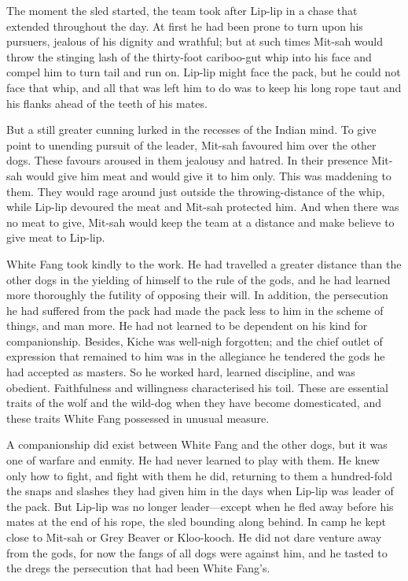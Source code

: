 \documentclass[10pt]{book}
\begin{document}
The moment the sled started, the team took after Lip-lip in a chase
that extended throughout the day. At first he had been prone to turn
upon his pursuers, jealous of his dignity and wrathful; but at such
times Mit-sah would throw the stinging lash of the thirty-foot
cariboo-gut whip into his face and compel him to turn tail and run on.
Lip-lip might face the pack, but he could not face that whip, and all
that was left him to do was to keep his long rope taut and his flanks
ahead of the teeth of his mates.

But a still greater cunning lurked in the recesses of the Indian mind.
To give point to unending pursuit of the leader, Mit-sah favoured him
over the other dogs. These favours aroused in them jealousy and hatred.
In their presence Mit-sah would give him meat and would give it to him
only. This was maddening to them. They would rage around just outside
the throwing-distance of the whip, while Lip-lip devoured the meat and
Mit-sah protected him. And when there was no meat to give, Mit-sah
would keep the team at a distance and make believe to give meat to
Lip-lip.

White Fang took kindly to the work. He had travelled a greater distance
than the other dogs in the yielding of himself to the rule of the gods,
and he had learned more thoroughly the futility of opposing their will.
In addition, the persecution he had suffered from the pack had made the
pack less to him in the scheme of things, and man more. He had not
learned to be dependent on his kind for companionship. Besides, Kiche
was well-nigh forgotten; and the chief outlet of expression that
remained to him was in the allegiance he tendered the gods he had
accepted as masters. So he worked hard, learned discipline, and was
obedient. Faithfulness and willingness characterised his toil. These
are essential traits of the wolf and the wild-dog when they have become
domesticated, and these traits White Fang possessed in unusual measure.

A companionship did exist between White Fang and the other dogs, but it
was one of warfare and enmity. He had never learned to play with them.
He knew only how to fight, and fight with them he did, returning to
them a hundred-fold the snaps and slashes they had given him in the
days when Lip-lip was leader of the pack. But Lip-lip was no longer
leader—except when he fled away before his mates at the end of his
rope, the sled bounding along behind. In camp he kept close to Mit-sah
or Grey Beaver or Kloo-kooch. He did not dare venture away from the
gods, for now the fangs of all dogs were against him, and he tasted to
the dregs the persecution that had been White Fang’s.
\end{document}
